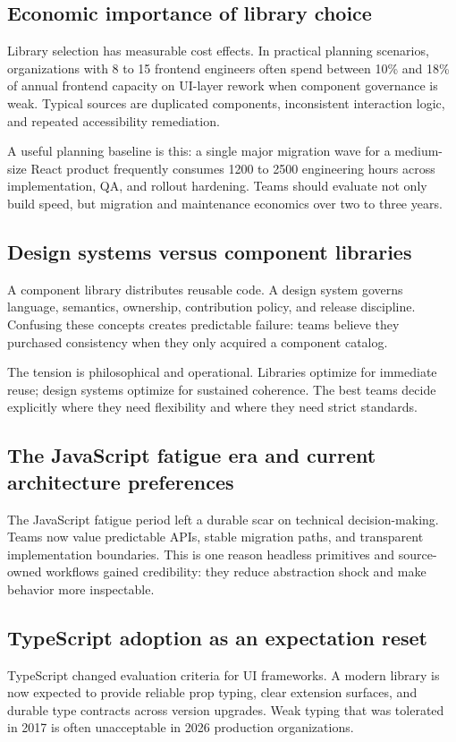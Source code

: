 \documentclass[11pt,twoside,a4paper]{article}
\begin{document}
\subsection{Economic importance of library choice}
Library selection has measurable cost effects. In practical planning scenarios, organizations with 8 to 15 frontend engineers often spend between 10\% and 18\% of annual frontend capacity on UI-layer rework when component governance is weak. Typical sources are duplicated components, inconsistent interaction logic, and repeated accessibility remediation.

A useful planning baseline is this: a single major migration wave for a medium-size React product frequently consumes 1200 to 2500 engineering hours across implementation, QA, and rollout hardening. Teams should evaluate not only build speed, but migration and maintenance economics over two to three years.

\subsection{Design systems versus component libraries}
A component library distributes reusable code. A design system governs language, semantics, ownership, contribution policy, and release discipline. Confusing these concepts creates predictable failure: teams believe they purchased consistency when they only acquired a component catalog.

The tension is philosophical and operational. Libraries optimize for immediate reuse; design systems optimize for sustained coherence. The best teams decide explicitly where they need flexibility and where they need strict standards.

\subsection{The JavaScript fatigue era and current architecture preferences}
The JavaScript fatigue period left a durable scar on technical decision-making. Teams now value predictable APIs, stable migration paths, and transparent implementation boundaries. This is one reason headless primitives and source-owned workflows gained credibility: they reduce abstraction shock and make behavior more inspectable.

\subsection{TypeScript adoption as an expectation reset}
TypeScript changed evaluation criteria for UI frameworks. A modern library is now expected to provide reliable prop typing, clear extension surfaces, and durable type contracts across version upgrades. Weak typing that was tolerated in 2017 is often unacceptable in 2026 production organizations.
\end{document}
